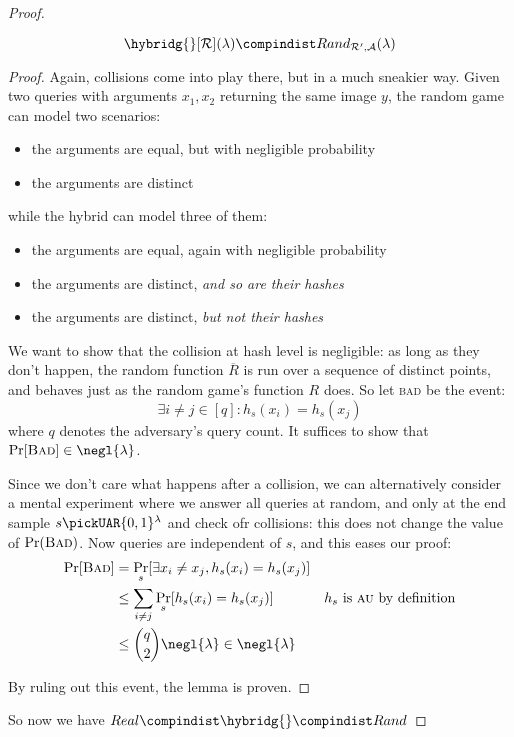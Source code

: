 \begin{proof}
    \begin{lemma}
        \[
            \hybridg{}[\R](\lambda) \compindist Rand_{\R', \A}(\lambda)
        \]
    \end{lemma}

    \begin{proof}

        Again, collisions come into play there, but in a much sneakier way. Given two queries with arguments $x_1, x_2$ returning the same image $y$, the random game can model two scenarios:

        \begin{itemize}
            \item the arguments are equal, but with negligible probability
            \item the arguments are distinct
        \end{itemize}

        while the hybrid can model three of them:

        \begin{itemize}
            \item the arguments are equal, again with negligible probability
            \item the arguments are distinct, \emph{and so are their hashes}
            \item the arguments are distinct, \emph{but not their hashes}
        \end{itemize}
    
        We want to show that the collision at hash level is negligible: as long as they don't happen, the random function $\overline{R}$ is run over a sequence of distinct points, and behaves just as the random game's function $R$ does. So let \textsc{bad} be the event:
        \[
            \exists i \neq j \in [q] : h_s(x_i) = h_s(x_j)
        \]
        where $q$ denotes the adversary's query count. It suffices to show that $\Pr[\textsc{Bad}] \in \negl{\lambda}$.

        Since we don't care what happens after a collision, we can alternatively consider a mental experiment where we answer all queries at random, and only at the end sample $s \pickUAR \{0, 1\}^\lambda$ and check ofr collisions: this does not change the value of $\Pr(\textsc{Bad})$. Now queries are independent of $s$, and this eases our proof:
        \begin{align*}
            \Pr[\textsc{Bad}] &= \Pr_s [\exists x_i \neq x_j, h_s(x_i) = h_s(x_j)] &\\
            &\leq \sum_{i \neq j} \Pr_s [h_s(x_i) = h_s(x_j)] & h_s \text{ is \textsc{au} by definition} \\
            &\leq {q \choose 2} \negl{\lambda} \in \negl{\lambda} &
        \end{align*}

        By ruling out this event, the lemma is proven.
    \end{proof}

     So now we have $Real \compindist \hybridg{} \compindist Rand$
\end{proof}

